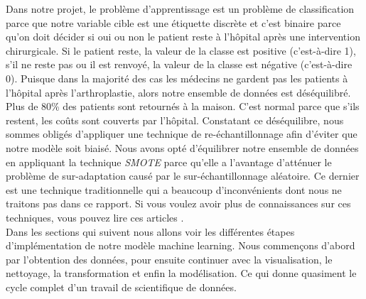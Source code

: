 \documentclass[12pt, french]{report}
\begin{document}
Dans notre projet, le problème d'apprentissage est un problème de classification parce que notre variable cible est une étiquette discrète et c'est binaire parce qu'on doit décider si oui ou non le patient reste à l'hôpital après une intervention chirurgicale. Si le patient reste, la valeur de la classe est positive (c'est-à-dire 1), s'il ne reste pas ou il est renvoyé, la valeur de la classe est négative (c'est-à-dire 0). Puisque dans la majorité des cas les médecins ne gardent pas les patients à l'hôpital après l'arthroplastie, alors notre ensemble de données est déséquilibré. Plus de 80\% des patients sont retournés à la maison. C'est normal parce que s'ils restent, les coûts sont couverts par l'hôpital. Constatant ce déséquilibre, nous sommes obligés d'appliquer une technique de re-échantillonnage afin d'éviter que notre modèle soit biaisé.  Nous avons opté d'équilibrer notre ensemble de données en appliquant la technique \textit{SMOTE} parce qu'elle a l'avantage d'atténuer le problème de sur-adaptation causé par le sur-échantillonnage aléatoire. Ce dernier est une technique traditionnelle qui a beaucoup d'inconvénients dont nous ne traitons pas dans ce rapport. Si vous voulez avoir plus de connaissances sur ces techniques, vous pouvez lire ces articles \cite{key45, key23, key29}. \\



Dans les sections qui suivent nous allons voir les différentes étapes d'implémentation de notre modèle machine learning. Nous commençons d'abord par l'obtention des données, pour ensuite continuer avec la visualisation, le nettoyage, la transformation et enfin la modélisation. Ce qui donne quasiment le cycle complet d'un travail de scientifique de données.
\end{document}
